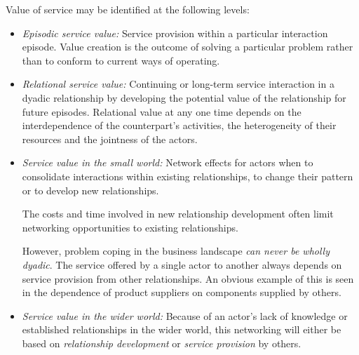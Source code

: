 \documentclass[11pt,a4paper]{article}
\begin{document}
Value of service may be identified at the following levels:
\begin{itemize}
\item \emph{Episodic service value:} Service provision within a particular
  interaction episode. Value creation is the outcome of solving a particular
  problem rather than to conform to current ways of operating.

\item \emph{Relational service value:} Continuing or long-term service
  interaction in a dyadic relationship by developing the potential value of
  the relationship for future episodes.  Relational value at any one time
  depends on the interdependence of the counterpart's activities, the
  heterogeneity of their resources and the jointness of the actors.

\item \emph{Service value in the small world:} Network effects for actors
  when to consolidate interactions within existing relationships, to change
  their pattern or to develop new relationships.

  The costs and time involved in new relationship development often limit
  networking opportunities to existing relationships.

  However, problem coping in the business landscape \emph{can never be wholly
    dyadic}.  The service offered by a single actor to another always depends
  on service provision from other relationships.  An obvious example of this
  is seen in the dependence of product suppliers on components supplied by
  others.

\item \emph{Service value in the wider world:} Because of an actor's lack of
  knowledge or established relationships in the wider world, this networking
  will either be based on \emph{relationship development} or \emph{service
    provision} by others.
\end{itemize}
\end{document}
